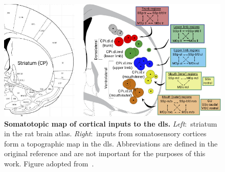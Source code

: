 \begin{figure}[bth!]
  \begin{center}
    \includegraphics[width=1\linewidth]{ch-intro/figures/StriatumInputMap}
    \caption[Map of Cortical Inputs to DLS]
    {\textbf{Somatotopic map of cortical inputs to the \gls{dls}.}
    \textit{Left}:~striatum in the rat brain atlas.
    \textit{Right}:~inputs from somatosensory cortices form a topographic map in the \gls{dls}.
    Abbreviations are defined in the original reference and are not important for the purposes of this work.
    Figure adopted from~\cite{Hintiryan2016NN}.
    }
    \label{fig:intro:InputMap}
  \end{center}
\end{figure}